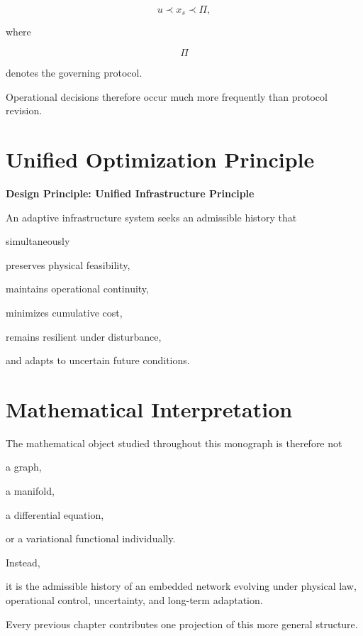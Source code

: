 \documentclass[11pt,fleqn]{book}
\numberwithin{equation}{chapter}
\newenvironment{principle}[1]
  {\begin{principleEnv}
   \noindent\textbf{Design Principle: #1}\par\smallskip\itshape}
  {\end{principleEnv}}
\theoremstyle{plain}
\theoremstyle{definition}
\theoremstyle{remark}
\begin{document}
\[
u
\prec
x_s
\prec
\Pi,
\]

where

\[
\Pi
\]

denotes the governing protocol.

Operational decisions therefore occur much more frequently than protocol
revision.


\section{Unified Optimization Principle}

\begin{principle}{Unified Infrastructure Principle}

An adaptive infrastructure system seeks an admissible history that

simultaneously

preserves physical feasibility,

maintains operational continuity,

minimizes cumulative cost,

remains resilient under disturbance,

and adapts to uncertain future conditions.

\end{principle}


\section{Mathematical Interpretation}

The mathematical object studied throughout this monograph is therefore
not

a graph,

a manifold,

a differential equation,

or a variational functional individually.

Instead,

it is the admissible history of an embedded network evolving under
physical law, operational control, uncertainty, and long-term
adaptation.

Every previous chapter contributes one projection of this more general
structure.

\end{document}
